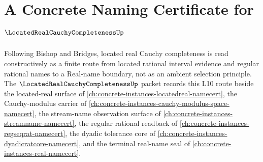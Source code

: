 \chapter{A Concrete Naming Certificate for $\LocatedRealCauchyCompletenessUp$}
\label{ch:concrete-instances-located-real-cauchy-completeness-namecert}

Following Bishop and Bridges, located real Cauchy completeness is read constructively as a finite route from located rational interval evidence and regular rational names to a Real-name boundary, not as an ambient selection principle. The $\LocatedRealCauchyCompletenessUp$ packet records this L10 route beside the located-real surface of \autoref{ch:concrete-instances-locatedreal-namecert}, the Cauchy-modulus carrier of \autoref{ch:concrete-instances-cauchy-modulus-space-namecert}, the stream-name observation surface of \autoref{ch:concrete-instances-streamname-namecert}, the regular rational readback of \autoref{ch:concrete-instances-regseqrat-namecert}, the dyadic tolerance core of \autoref{ch:concrete-instances-dyadicratcore-namecert}, and the terminal real-name seal of \autoref{ch:concrete-instances-real-namecert}.

